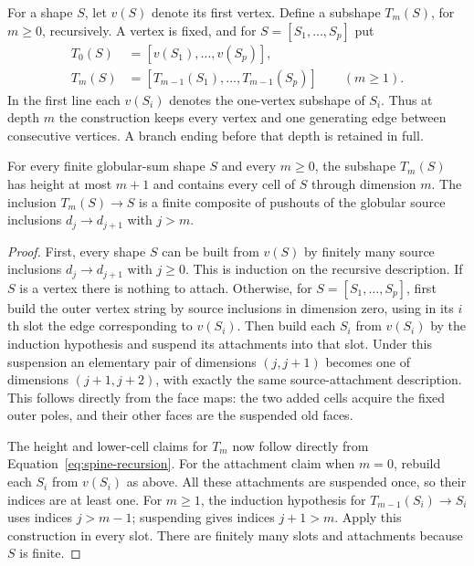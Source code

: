 For a shape $S$, let $v(S)$ denote its first vertex.  Define a
subshape $T_m(S)$, for $m\geq0$, recursively.  A vertex is fixed, and
for $S=[S_1,\ldots,S_p]$ put
\begin{equation}\label{eq:spine-recursion}
\begin{split}
 T_0(S)&=[v(S_1),\ldots,v(S_p)],\\
 T_m(S)&=[T_{m-1}(S_1),\ldots,T_{m-1}(S_p)]\qquad(m\geq1).
\end{split}
\end{equation}
In the first line each $v(S_i)$ denotes the one-vertex subshape of
$S_i$.  Thus at depth $m$ the construction keeps every vertex and
one generating edge between consecutive vertices.  A branch ending
before that depth is retained in full.

\begin{lemma}\label{lem:spine}
For every finite globular-sum shape $S$ and every $m\geq0$, the
subshape $T_m(S)$ has height at most $m+1$ and contains every cell of
$S$ through dimension $m$.  The inclusion $T_m(S)\to S$ is a finite
composite of pushouts of the globular source inclusions
$d_j\to d_{j+1}$ with $j>m$.
\end{lemma}

\begin{proof}
First, every shape $S$ can be built from $v(S)$ by finitely many
source inclusions $d_j\to d_{j+1}$ with $j\geq0$.  This is induction
on the recursive description.  If $S$ is a vertex there is nothing
to attach.  Otherwise, for $S=[S_1,\ldots,S_p]$, first build the
outer vertex string by source inclusions in dimension zero, using
in its $i$th slot the edge corresponding to $v(S_i)$.  Then build
each $S_i$ from $v(S_i)$ by the induction hypothesis and suspend its
attachments into that slot.  Under this suspension an elementary
pair of dimensions $(j,j+1)$ becomes one of dimensions $(j+1,j+2)$,
with exactly the same source-attachment description.  This follows
directly from the face maps: the two added cells acquire the fixed
outer poles, and their other faces are the suspended old faces.

The height and lower-cell claims for $T_m$ now follow directly from
Equation~\eqref{eq:spine-recursion}.  For the attachment claim when
$m=0$, rebuild each $S_i$ from $v(S_i)$ as above.  All these
attachments are suspended once, so their indices are at least
one.  For $m\geq1$, the induction hypothesis for
$T_{m-1}(S_i)\to S_i$ uses indices $j>m-1$; suspending gives indices
$j+1>m$.  Apply this construction in every slot.  There are finitely
many slots and attachments because $S$ is finite.
\end{proof}

